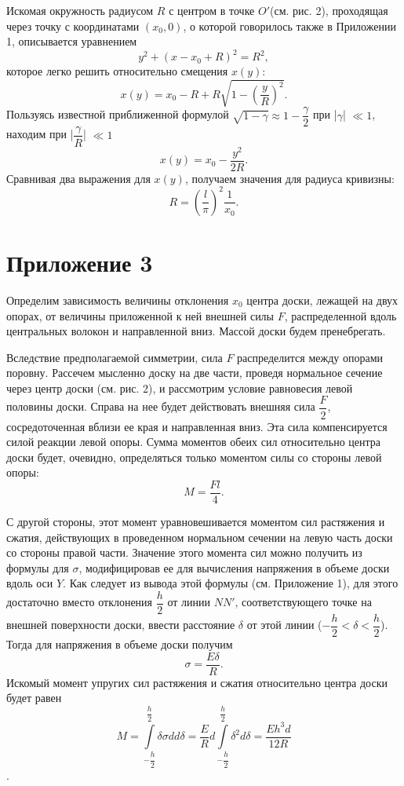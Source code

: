 \documentclass[a4paper,12pt]{article} %
\begin{document}
Искомая окружность радиусом $R$ с центром в точке $O'$(см. рис. 2), проходящая через точку с координатами $(x_0, 0)$, о которой говорилось также в Приложении 1, описывается уравнением $$y^2 + (x - x_0 + R)^2 = R^2,$$ которое легко решить относительно смещения $x(y)$: $$x(y) = x_0 - R + R\sqrt{1 - \left(\dfrac{y}{R}\right)^2}.$$ Пользуясь известной приближенной формулой $\sqrt{1 - \gamma} \approx 1 - \dfrac{\gamma}{2}$ при |$\gamma$| $\ll 1$, находим при |$\dfrac{\gamma}{R}$| $\ll 1$ $$x(y) = x_0 - \dfrac{y^2}{2R}.$$
Сравнивая два выражения для $x(y)$, получаем значения для радиуса кривизны: $$R = \left(\dfrac{l}{\pi}\right)^2 \dfrac{1}{x_0}.$$

\section*{Приложение 3}

Определим зависимость величины отклонения $x_0$ центра доски, лежащей на двух опорах, от величины приложенной к ней внешней силы $F$, распределенной вдоль центральных волокон и направленной вниз. Массой доски будем пренебрегать.

Вследствие предполагаемой симметрии, сила $F$ распределится между опорами поровну. Рассечем мысленно доску на две части, проведя нормальное сечение через центр доски (см. рис. 2), и рассмотрим условие равновесия левой половины доски. Справа на нее будет действовать внешняя сила $\dfrac{F}{2}$, сосредоточенная вблизи ее края и направленная вниз. Эта сила компенсируется силой реакции левой опоры. Сумма моментов обеих сил относительно центра доски будет, очевидно, определяться только моментом силы со стороны левой опоры: $$M = \dfrac{Fl}{4}.$$

С другой стороны, этот момент уравновешивается моментом сил растяжения и сжатия, действующих в проведенном нормальном сечении на левую часть доски со стороны правой части. Значение этого момента сил можно получить из формулы для $\sigma$, модифицировав ее для вычисления напряжения в объеме доски вдоль оси $Y$. Как следует из вывода этой формулы (см. Приложение 1), для этого достаточно вместо отклонения $\dfrac{h}{2}$ от линии $NN'$, соответствующего точке на внешней поверхности доски, ввести расстояние $\delta$ от этой линии ($-\dfrac{h}{2} < \delta < \dfrac{h}{2}$). Тогда для напряжения в объеме доски получим $$\sigma = \dfrac{E\delta}{R}.$$ Искомый момент упругих сил растяжения и сжатия относительно центра доски будет равен \[M = \int\limits_{-\dfrac{h}{2}}^{\dfrac{h}{2}}\delta \sigma d d\delta = \dfrac{E}{R}d\int\limits_{-\dfrac{h}{2}}^{\dfrac{h}{2}}\delta^2 d\delta = \dfrac{Eh^3d}{12R}\].
\end{document}
